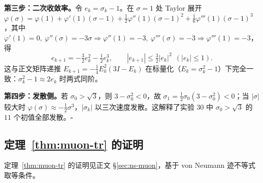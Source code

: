 \textbf{第三步：二次收敛率。}\quad 令 $e_k=\sigma_k-1$。在 $\sigma=1$ 处 Taylor 展开 $\varphi(\sigma)=\varphi(1)+\varphi'(1)(\sigma-1)+\tfrac12\varphi''(1)(\sigma-1)^2+\tfrac16\varphi'''(1)(\sigma-1)^3$，其中 $\varphi'(1)=0,\ \varphi''(\sigma)=-3\sigma\Rightarrow\varphi''(1)=-3,\ \varphi'''(\sigma)=-3\Rightarrow\varphi'''(1)=-3$，得
\[
  e_{k+1}=-\tfrac32 e_k^2-\tfrac12 e_k^3,
  \qquad |e_{k+1}|\le\tfrac32|e_k|^2\ \ (|e_k|\le1).
\]
这与正文矩阵递推 $E_{k+1}=-\tfrac14E_k^2(3I-E_k)$ 在标量化（$E_k=\sigma_k^2-1$）下完全一致：$\sigma_k^2-1\approx2e_k$ 时两式同阶。

\textbf{第四步：发散侧。}\quad 若 $\sigma_0>\sqrt3$，则 $3-\sigma_0^2<0$，故 $\sigma_1=\tfrac12\sigma_0(3-\sigma_0^2)<0$；当 $|\sigma|$ 较大时 $\varphi(\sigma)\approx-\tfrac12\sigma^3$，$|\sigma_k|$ 以三次速度发散。这解释了实验 30 中 $\sigma_0>\sqrt3$ 的 $11$ 个初值全部发散。$\square$

\subsection{定理~\ref{thm:muon-tr} 的证明}

定理~\ref{thm:muon-tr} 的证明见正文 \S\ref{sec:ns-muon}，基于 von Neumann 迹不等式取等条件。
